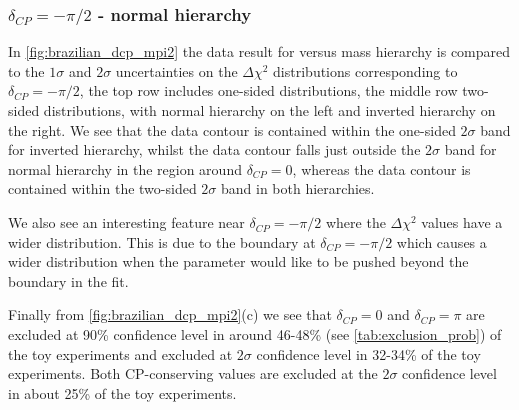 \subsubsection{$\delta_{CP} = -\pi/2$ - normal hierarchy}

In \cref{fig:brazilian_dcp_mpi2} the \RunPeriod data result for \deltacp versus mass hierarchy is compared to the $1\sigma$ and $2\sigma$ uncertainties on the $\Delta\chi^2$ distributions corresponding to $\delta_{CP} = -\pi/2$, the top row includes one-sided distributions, the middle row two-sided distributions, with normal hierarchy on the left and inverted hierarchy on the right. We see that the data contour is contained within the one-sided $2\sigma$ band for inverted hierarchy, whilst the data contour falls just outside the $2\sigma$ band for normal hierarchy in the region around $\delta_{CP} = 0$, whereas the data contour is contained within the two-sided $2\sigma$ band in both hierarchies.

We also see an interesting feature near $\delta_{CP} = -\pi/2$ where the $\Delta\chi^2$ values have a wider distribution. This is due to the boundary at $\delta_{CP} = -\pi/2$ which causes a wider distribution when the parameter \deltacp would like to be pushed beyond the boundary in the fit.

Finally from \cref{fig:brazilian_dcp_mpi2}(c) we see that $\delta_{CP} = 0$ and $\delta_{CP} = \pi$ are excluded at 90\% confidence level in around 46-48\% (see \cref{tab:exclusion_prob}) of the toy experiments and excluded at $2\sigma$ confidence level in 32-34\% of the toy experiments. Both CP-conserving values are excluded at the $2\sigma$ confidence level in about 25\% of the toy experiments.

